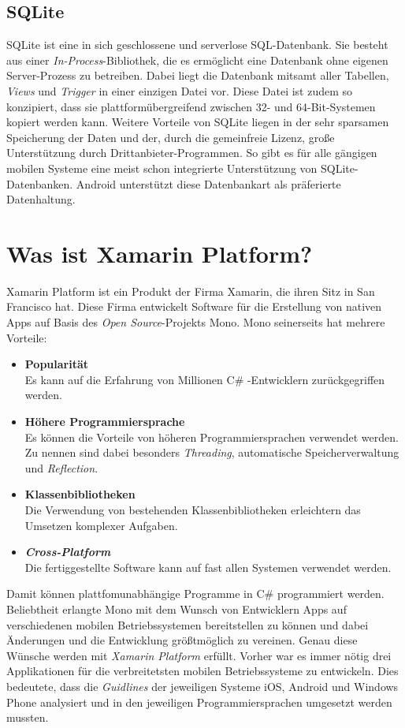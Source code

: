 \subsection{SQLite}
\label{ssec:android-sqlite}
SQLite ist eine in sich geschlossene und serverlose \ac{SQL}-Datenbank. Sie besteht aus einer \textit{In-Process}-Bibliothek, die es ermöglicht eine Datenbank ohne eigenen Server-Prozess zu betreiben. Dabei liegt die Datenbank mitsamt aller Tabellen, \textit{Views} und \textit{\ac{Trigger}} in einer einzigen Datei vor. Diese Datei ist zudem so konzipiert, dass sie plattformübergreifend zwischen 32- und 64-Bit-Systemen kopiert werden kann. Weitere Vorteile von SQLite liegen in der sehr sparsamen Speicherung der Daten und der, durch die gemeinfreie Lizenz, große Unterstützung durch Drittanbieter-Programmen. So gibt es für alle gängigen mobilen Systeme eine meist schon integrierte Unterstützung von SQLite-Datenbanken. Android unterstützt diese Datenbankart als präferierte Datenhaltung.
\section{Was ist Xamarin Platform?}
\label{sec:defintion-xamarin}
Xamarin Platform ist ein Produkt der Firma Xamarin, die ihren Sitz in San Francisco hat. Diese Firma entwickelt Software für die Erstellung von nativen Apps auf Basis des \textit{Open Source}-Projekts \ac{Mono}. Mono seinerseits hat mehrere Vorteile:
\begin{itemize}
\item \textbf{Popularität}\\Es kann auf die Erfahrung von Millionen C\# -Entwicklern zurückgegriffen werden.
\item \textbf{Höhere Programmiersprache} \\Es können die Vorteile von höheren Programmiersprachen verwendet werden. Zu nennen sind dabei besonders \textit{Threading}, automatische Speicherverwaltung und \textit{\ac{Reflection}}.
\item \textbf{Klassenbibliotheken}\\Die Verwendung von bestehenden Klassenbibliotheken erleichtern das Umsetzen komplexer Aufgaben.
\item \textbf{\textit{Cross-Platform}}\\Die fertiggestellte Software kann auf fast allen Systemen verwendet werden.
\end{itemize}
Damit können plattfomunabhängige Programme in C\# programmiert werden. Beliebtheit erlangte Mono mit dem Wunsch von Entwicklern Apps auf verschiedenen mobilen Betriebssystemen bereitstellen zu können und dabei Änderungen und die Entwicklung größtmöglich zu vereinen. Genau diese Wünsche werden mit \textit{Xamarin Platform} erfüllt. Vorher war es immer nötig drei Applikationen für die verbreitetsten mobilen Betriebssysteme zu entwickeln. Dies bedeutete, dass die \textit{Guidlines} der jeweiligen Systeme iOS, Android und Windows Phone analysiert und in den jeweiligen Programmiersprachen umgesetzt werden mussten.

